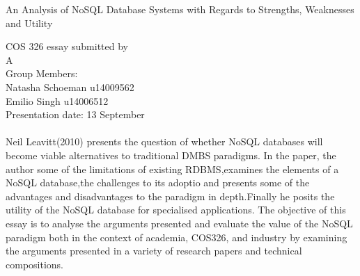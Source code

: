 \documentclass[12pt]{article}
\begin{document}
\begin{titlepage}

\begin{center}
\begin{Huge}
An Analysis of NoSQL Database Systems with Regards to Strengths, Weaknesses and Utility
\begin{large}
\begin{center}
COS 326 essay submitted by
\\
A\\
Group Members:\\
Natasha Schoeman u14009562
\\
Emilio Singh u14006512
\\
Presentation date: 13 September

\end{center}
\end{large}
\end{Huge}

\end{center}
\end{titlepage}
\pagebreak

\paragraph{}
Neil Leavitt(2010) presents the question of whether NoSQL databases will become viable alternatives to traditional DMBS paradigms. In the paper, the author some of the limitations of existing RDBMS,examines the elements of a NoSQL database,the challenges to its adoptio and presents some of the advantages and disadvantages to the paradigm in depth.Finally he posits the utility of the NoSQL database for specialised applications. The objective of this essay is to analyse the arguments presented and evaluate the value of the NoSQL paradigm both in the context of academia, COS326, and industry by examining the arguments presented in a variety of research papers and technical compositions.
\end{document}
